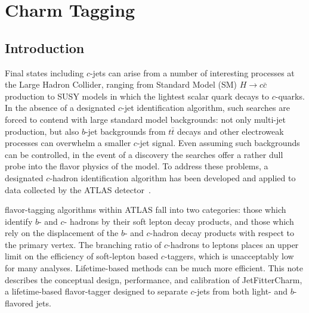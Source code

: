 \chapter{Charm Tagging}

\section{Introduction}
\label{tag:sec:into}

\newcommand{\catpt}{15, 25, 35, 50, 80, 120, 200, $\infty$}
\newcommand{\cateta}{0, 0.7, 1.5, 2.5}
\newcommand{\jfcplotswherefrom}{The jets are from $t \bar{t}$ simulated events generated with \textsc{Powheg+Pythia6}.}

Final states including $c$-jets can arise from a number of interesting processes at the Large Hadron Collider, ranging from Standard Model (SM) $H \to c\bar{c}$ production to SUSY models in which the lightest scalar quark decays to $c$-quarks. In the absence of a designated $c$-jet identification algorithm, such searches are forced to contend with large standard model backgrounds: not only multi-jet production, but also $b$-jet backgrounds from $t\bar{t}$ decays and other electroweak processes can overwhelm a smaller $c$-jet signal. Even assuming such backgrounds can be controlled, in the event of a discovery the searches offer a rather dull probe into the flavor physics of the model. To address these problems, a designated $c$-hadron identification algorithm has been developed and applied to data collected by the ATLAS detector~\cite{DetPap}.

flavor-tagging algorithms within ATLAS fall into two categories: those which identify $b$- and $c$- hadrons by their soft lepton decay products, and those which rely on the displacement of the $b$- and $c$-hadron decay products with respect to the primary vertex. The branching ratio of $c$-hadrons to leptons places an upper limit on the efficiency of soft-lepton based $c$-taggers, which is unacceptably low for many analyses. Lifetime-based methods can be much more efficient.
This note describes the conceptual design, performance, and calibration of JetFitterCharm, a lifetime-based flavor-tagger designed to separate $c$-jets from both light- and $b$-flavored jets.

